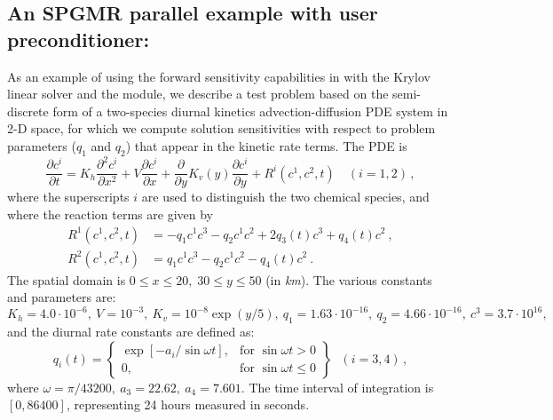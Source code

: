 
\newpage
\subsection{An SPGMR parallel example with user preconditioner: }
\label{ss:cvsfwdkryx_p}

As an example of using the forward sensitivity capabilities in {\cvodes} 
with the Krylov linear solver {\cvspgmr} and the {\nvecp} module, 
we describe a test problem based on the
semi-discrete form of a two-species diurnal kinetics advection-diffusion PDE 
system in 2-D space, for which we compute solution sensitivities with respect to 
problem parameters ($q_1$ and $q_2$) that appear in the kinetic rate terms.
The PDE is
\begin{equation}\label{e:cvsfwdkryx_p_PDE}
  \frac{\partial c^i}{\partial t} = K_h\frac{\partial^2 c^i}{\partial x^2}
  +V \frac{\partial c^i}{\partial x}
  + \frac{\partial} {\partial y} K_v(y) \frac{\partial c^i}{\partial y}
  + R^i(c^1,c^2,t) \quad (i=1,2) \, ,
\end{equation}
where the superscripts $i$ are used to distinguish the two chemical
species, and where the reaction terms are given by
\begin{equation}\label{e:cvsfwdkryx_p_R}
  \begin{split}
    R^1(c^1,c^2,t) & = -q_1c^1c^3-q_2c^1c^2+2q_3(t)c^3+q_4(t)c^2 ~, \\
    R^2(c^1,c^2,t) & = q_1c^1c^3-q_2c^1c^2-q_4(t)c^2 ~.
  \end{split}
\end{equation}
The spatial domain is $0 \leq x \leq 20,\;30 \leq y \leq 50$ (in {\em km}). 
The various constants and parameters are: $K_h=4.0\cdot 10^{-6},
~ V=10^{-3},~ K_v=10^{-8}\exp (y/5),~ q_1=1.63\cdot 10^{-16},
~ q_2=4.66\cdot 10^{-16},~ c^3=3.7\cdot 10^{16},$ and the diurnal
rate constants are defined as:
\begin{equation*}
  q_i(t) = 
  \left\{ \begin{array}{ll}
      \exp [-a_i/\sin \omega t], & \mbox{for } \sin \omega t>0 \\
      0, & \mbox{for } \sin \omega t\leq 0
    \end{array} \right\} ~~~(i=3,4) \, ,
\end{equation*}
where $\omega =\pi /43200, ~ a_3=22.62,~ a_4=7.601.$  The time interval of
integration is $[0, 86400]$, representing 24 hours measured in seconds.

